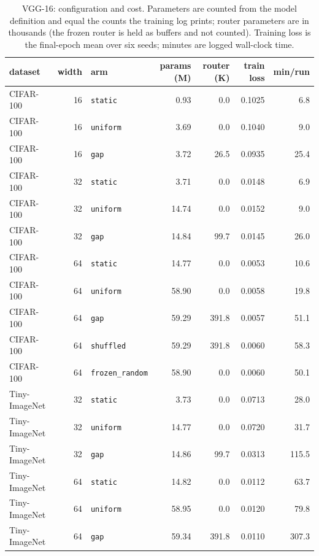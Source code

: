 \documentclass[10pt,a4paper]{article}
\begin{document}
\begin{table}[h]\centering\small
\caption{VGG-16: configuration and cost. Parameters are counted from the
model definition and equal the counts the training log prints; router
parameters are in thousands (the frozen router is held as buffers and not
counted). Training loss is the final-epoch mean over six seeds; minutes
are logged wall-clock time.}
\label{tab:vgconfig}
\begin{tabular}{l r l rr r r}
\toprule
dataset & width & arm & params (M) & router (K) & train loss & min/run \\
\midrule
CIFAR-100 & 16 & \texttt{static} & 0.93 & 0.0 & 0.1025 & 6.8 \\
CIFAR-100 & 16 & \texttt{uniform} & 3.69 & 0.0 & 0.1040 & 9.0 \\
CIFAR-100 & 16 & \texttt{gap} & 3.72 & 26.5 & 0.0935 & 25.4 \\
CIFAR-100 & 32 & \texttt{static} & 3.71 & 0.0 & 0.0148 & 6.9 \\
CIFAR-100 & 32 & \texttt{uniform} & 14.74 & 0.0 & 0.0152 & 9.0 \\
CIFAR-100 & 32 & \texttt{gap} & 14.84 & 99.7 & 0.0145 & 26.0 \\
CIFAR-100 & 64 & \texttt{static} & 14.77 & 0.0 & 0.0053 & 10.6 \\
CIFAR-100 & 64 & \texttt{uniform} & 58.90 & 0.0 & 0.0058 & 19.8 \\
CIFAR-100 & 64 & \texttt{gap} & 59.29 & 391.8 & 0.0057 & 51.1 \\
CIFAR-100 & 64 & \texttt{shuffled} & 59.29 & 391.8 & 0.0060 & 58.3 \\
CIFAR-100 & 64 & \texttt{frozen\_random} & 58.90 & 0.0 & 0.0060 & 50.1 \\
Tiny-ImageNet & 32 & \texttt{static} & 3.73 & 0.0 & 0.0713 & 28.0 \\
Tiny-ImageNet & 32 & \texttt{uniform} & 14.77 & 0.0 & 0.0720 & 31.7 \\
Tiny-ImageNet & 32 & \texttt{gap} & 14.86 & 99.7 & 0.0313 & 115.5 \\
Tiny-ImageNet & 64 & \texttt{static} & 14.82 & 0.0 & 0.0112 & 63.7 \\
Tiny-ImageNet & 64 & \texttt{uniform} & 58.95 & 0.0 & 0.0120 & 79.8 \\
Tiny-ImageNet & 64 & \texttt{gap} & 59.34 & 391.8 & 0.0110 & 307.3 \\
\bottomrule
\end{tabular}
\end{table}
\end{document}
